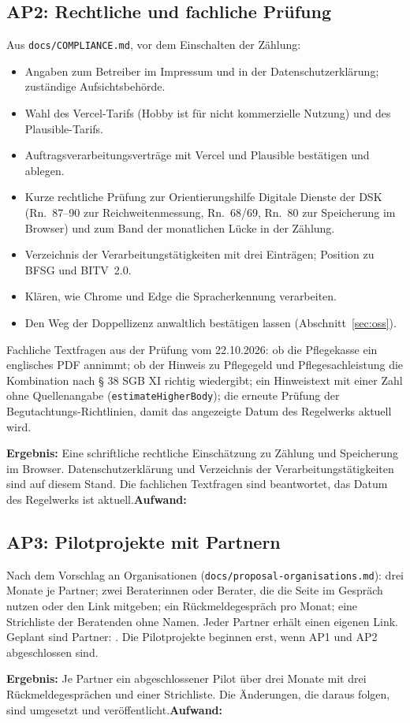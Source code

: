 \documentclass[11pt,a4paper,parskip=half-]{scrartcl}
\begin{document}
\subsection*{AP2: Rechtliche und fachliche Prüfung}
Aus \texttt{docs/COMPLIANCE.md}, vor dem Einschalten der Zählung:
\begin{itemize}
  \item Angaben zum Betreiber im Impressum und in der Datenschutzerklärung; zuständige Aufsichtsbehörde.
  \item Wahl des Vercel-Tarifs (Hobby ist für nicht kommerzielle Nutzung) und des Plausible-Tarifs.
  \item Auftragsverarbeitungsverträge mit Vercel und Plausible bestätigen und ablegen.
  \item Kurze rechtliche Prüfung zur Orientierungshilfe Digitale Dienste der DSK
        (Rn.~87--90 zur Reichweitenmessung, Rn.~68/69, Rn.~80 zur Speicherung im Browser)
        und zum Band der monatlichen Lücke in der Zählung.
  \item Verzeichnis der Verarbeitungstätigkeiten mit drei Einträgen; Position zu BFSG und BITV~2.0.
  \item Klären, wie Chrome und Edge die Spracherkennung verarbeiten.
  \item Den Weg der Doppellizenz anwaltlich bestätigen lassen
        (Abschnitt~\ref{sec:oss}).
\end{itemize}
Fachliche Textfragen aus der Prüfung vom 22.10.2026: ob die Pflegekasse ein englisches PDF annimmt;
ob der Hinweis zu Pflegegeld und Pflegesachleistung die Kombination nach § 38 SGB XI
richtig wiedergibt; ein Hinweistext mit einer Zahl ohne Quellenangabe (\texttt{estimateHigherBody});
die erneute Prüfung der Begutachtungs-Richtlinien, damit das angezeigte Datum des Regelwerks
aktuell wird.
\par\textbf{Ergebnis:} Eine schriftliche rechtliche Einschätzung zu Zählung und Speicherung im Browser. Datenschutzerklärung und Verzeichnis der Verarbeitungstätigkeiten sind auf diesem Stand. Die fachlichen Textfragen sind beantwortet, das Datum des Regelwerks ist aktuell.\quad \textbf{Aufwand:} 

\subsection*{AP3: Pilotprojekte mit Partnern}
Nach dem Vorschlag an Organisationen (\texttt{docs/proposal-organisations.md}):
drei Monate je Partner; zwei Beraterinnen oder Berater, die die Seite im Gespräch nutzen oder
den Link mitgeben; ein Rückmeldegespräch pro Monat; eine Strichliste der Beratenden ohne Namen.
Jeder Partner erhält einen eigenen Link. Geplant sind  Partner:
. Die Pilotprojekte beginnen erst, wenn AP1 und AP2 abgeschlossen sind.
\par\textbf{Ergebnis:} Je Partner ein abgeschlossener Pilot über drei Monate mit drei Rückmeldegesprächen und einer Strichliste. Die Änderungen, die daraus folgen, sind umgesetzt und veröffentlicht.\quad \textbf{Aufwand:} 
\end{document}
